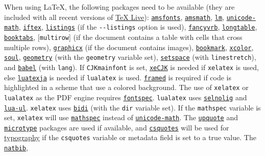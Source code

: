 \documentclass[
  b5paper
]{book}
\begin{document}
When using LaTeX, the following packages need to be available (they are
included with all recent versions of
\href{https://www.tug.org/texlive/}{TeX Live}):
\href{https://ctan.org/pkg/amsfonts}{\texttt{amsfonts}},
\href{https://ctan.org/pkg/amsmath}{\texttt{amsmath}},
\href{https://ctan.org/pkg/lm}{\texttt{lm}},
\href{https://ctan.org/pkg/unicode-math}{\texttt{unicode-math}},
\href{https://ctan.org/pkg/iftex}{\texttt{iftex}},
\href{https://ctan.org/pkg/listings}{\texttt{listings}} (if the
\texttt{-\/-listings} option is used),
\href{https://ctan.org/pkg/fancyvrb}{\texttt{fancyvrb}},
\href{https://ctan.org/pkg/longtable}{\texttt{longtable}},
\href{https://ctan.org/pkg/booktabs}{\texttt{booktabs}},
{[}\texttt{multirow}{]} (if the document contains a table with cells
that cross multiple rows),
\href{https://ctan.org/pkg/graphicx}{\texttt{graphicx}} (if the document
contains images),
\href{https://ctan.org/pkg/bookmark}{\texttt{bookmark}},
\href{https://ctan.org/pkg/xcolor}{\texttt{xcolor}},
\href{https://ctan.org/pkg/soul}{\texttt{soul}},
\href{https://ctan.org/pkg/geometry}{\texttt{geometry}} (with the
\texttt{geometry} variable set),
\href{https://ctan.org/pkg/setspace}{\texttt{setspace}} (with
\texttt{linestretch}), and
\href{https://ctan.org/pkg/babel}{\texttt{babel}} (with \texttt{lang}).
If \texttt{CJKmainfont} is set,
\href{https://ctan.org/pkg/xecjk}{\texttt{xeCJK}} is needed if
\texttt{xelatex} is used, else
\href{https://ctan.org/pkg/luatexja}{\texttt{luatexja}} is needed if
\texttt{lualatex} is used.
\href{https://ctan.org/pkg/framed}{\texttt{framed}} is required if code
is highlighted in a scheme that use a colored background. The use of
\texttt{xelatex} or \texttt{lualatex} as the PDF engine requires
\href{https://ctan.org/pkg/fontspec}{\texttt{fontspec}}.
\texttt{lualatex} uses
\href{https://ctan.org/pkg/selnolig}{\texttt{selnolig}} and
\href{https://ctan.org/pkg/lua-ul}{\texttt{lua-ul}}. \texttt{xelatex}
uses \href{https://ctan.org/pkg/bidi}{\texttt{bidi}} (with the
\texttt{dir} variable set). If the \texttt{mathspec} variable is set,
\texttt{xelatex} will use
\href{https://ctan.org/pkg/mathspec}{\texttt{mathspec}} instead of
\href{https://ctan.org/pkg/unicode-math}{\texttt{unicode-math}}. The
\href{https://ctan.org/pkg/upquote}{\texttt{upquote}} and
\href{https://ctan.org/pkg/microtype}{\texttt{microtype}} packages are
used if available, and
\href{https://ctan.org/pkg/csquotes}{\texttt{csquotes}} will be used for
\hyperref[typography]{typography} if the \texttt{csquotes} variable or
metadata field is set to a true value. The
\href{https://ctan.org/pkg/natbib}{\texttt{natbib}},
\end{document}
